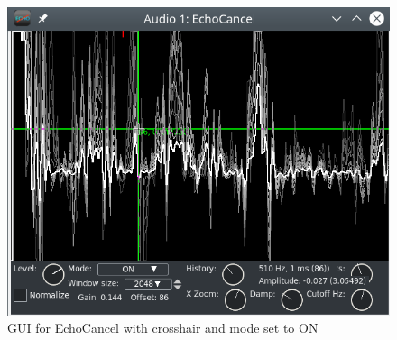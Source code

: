 \begin{figure}[htpb]
    \centering
    \includegraphics[width=0.8\linewidth]{images/echo-cancel.png}
    \caption{GUI for EchoCancel with crosshair and mode set to ON}
    \label{fig:echo-cancel}
\end{figure}


